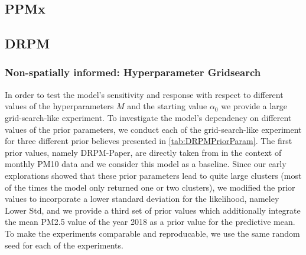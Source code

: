 \documentclass[12pt,a4paper]{article}
\begin{document}
\subsection{PPMx}
\subsection{DRPM}

\subsubsection{Non-spatially informed: Hyperparameter Gridsearch}
\label{subsubsec:DPRMNoSpatialGridsearch}
In order to test the model's sensitivity and response with respect to different values of the hyperparameters $M$ and the starting value
$\alpha_0$ we provide a large grid-search-like experiment. To investigate the model's dependency on different values of the prior parameters,
we conduct each of the grid-search-like experiment for three different prior believes presented in \cref{tab:DRPMPriorParam}. The first
prior values, namely DRPM-Paper, are directly taken from \cite[Section 4.1]{Page2021-Temporal} in the context of monthly PM10 data
and we consider this model as a baseline. Since our early explorations showed that these prior parameters lead to quite large clusters
(most of the times the model only returned one or two clusters), we modified the prior values to incorporate a lower standard deviation
for the likelihood, nameley Lower Std, and we provide a third set of prior values which additionally integrate the mean PM2.5 value
of the year 2018 as a prior value for the predictive mean. To make the experiments comparable and reproducable, we use the same
random seed for each of the experiments.
\end{document}
